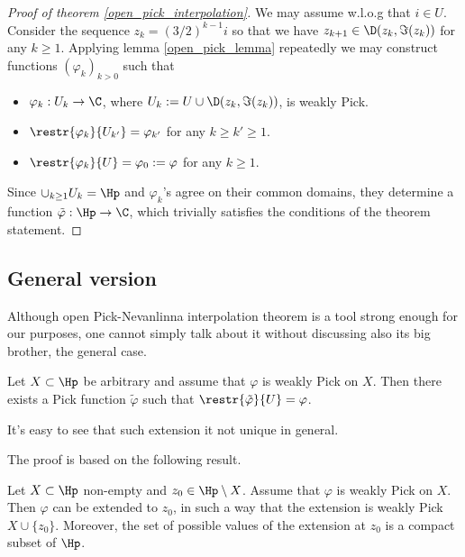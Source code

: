 \begin{proof}[Proof of theorem \ref{open_pick_interpolation}]
	We may assume w.l.o.g that $i \in U$. Consider the sequence $z_{k} = (3/2)^{k - 1} i$ so that we have $z_{k + 1} \in \D(z_{k}, \Im(z_{k}))$ for any $k \geq 1$. Applying lemma \ref{open_pick_lemma} repeatedly we may construct functions $(\varphi_{k})_{k > 0}$ such that
	\begin{itemize}
		\item $\varphi_{k} : U_{k} \to \C$, where $U_{k} := U \cup \D(z_{k}, \Im(z_{k}))$, is weakly Pick.
		\item $\restr{\varphi_{k}}{U_{k'}} = \varphi_{k'}$ for any $k \geq k' \geq 1$.
		\item $\restr{\varphi_{k}}{U} = \varphi_{0} := \varphi$ for any $k \geq 1$.
	\end{itemize}
	Since $\cup_{k \geq 1} U_{k} = \Hp$ and $\varphi_{k}$'s agree on their common domains, they determine a function $\tilde{\varphi} : \Hp \to \C$, which trivially satisfies the conditions of the theorem statement.
\end{proof}

\subsection{General version}

Although open Pick-Nevanlinna interpolation theorem is a tool strong enough for our purposes, one cannot simply talk about it without discussing also its big brother, the general case.

\begin{lause}\label{pick_interpolation}
	Let $X \subset \Hp$ be arbitrary and assume that $\varphi$ is weakly Pick on $X$. Then there exists a Pick function $\tilde{\varphi}$ such that $\restr{\tilde{\varphi}}{U} = \varphi$.
\end{lause}

It's easy to see that such extension it not unique in general.

The proof is based on the following result.

\begin{lem}\label{pick_extension_lemma}
	Let $X \subset \Hp$ non-empty and $z_{0} \in \Hp \setminus X$. Assume that $\varphi$ is weakly Pick on $X$. Then $\varphi$ can be extended to $z_{0}$, in such a way that the extension is weakly Pick $X \cup \{z_{0}\}$. Moreover, the set of possible values of the extension at $z_{0}$ is a compact subset of $\Hp$.
\end{lem}

